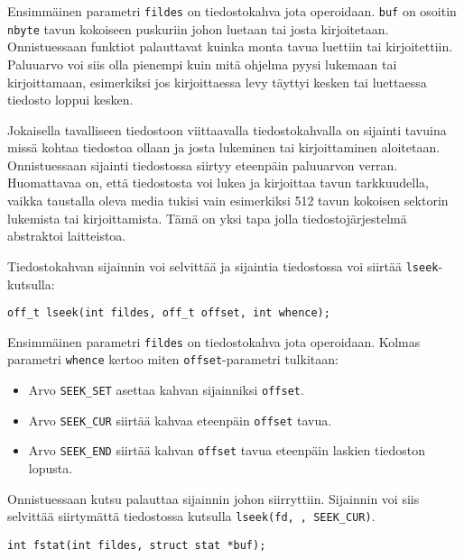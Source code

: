 Ensimmäinen parametri \texttt{fildes} on tiedostokahva jota operoidaan.
\texttt{buf} on osoitin \texttt{nbyte} tavun kokoiseen puskuriin johon
luetaan tai josta kirjoitetaan.
Onnistuessaan funktiot palauttavat kuinka monta tavua luettiin tai kirjoitettiin.
Paluuarvo voi siis olla pienempi kuin mitä ohjelma pyysi lukemaan tai kirjoittamaan,
esimerkiksi jos kirjoittaessa levy täyttyi kesken tai luettaessa
tiedosto loppui kesken.

Jokaisella tavalliseen tiedostoon viittaavalla tiedostokahvalla on
sijainti tavuina missä kohtaa tiedostoa ollaan ja josta
lukeminen tai kirjoittaminen aloitetaan.
Onnistuessaan sijainti tiedostossa siirtyy eteenpäin paluuarvon verran.
Huomattavaa on, että tiedostosta voi lukea ja kirjoittaa tavun tarkkuudella,
vaikka taustalla oleva media tukisi vain esimerkiksi 512 tavun kokoisen sektorin lukemista tai kirjoittamista.
Tämä on yksi tapa jolla tiedostojärjestelmä abstraktoi laitteistoa.

Tiedostokahvan sijainnin voi selvittää ja sijaintia tiedostossa voi
siirtää \texttt{lseek}-kutsulla:

\begin{verbatim}
off_t lseek(int fildes, off_t offset, int whence);
\end{verbatim}

Ensimmäinen parametri \texttt{fildes} on tiedostokahva jota operoidaan.
Kolmas parametri \texttt{whence} kertoo miten \texttt{offset}-parametri tulkitaan:

\begin{itemize}
    \item Arvo \texttt{SEEK\_SET} asettaa kahvan sijainniksi \texttt{offset}.
    \item Arvo \texttt{SEEK\_CUR} siirtää kahvaa eteenpäin \texttt{offset} tavua.
    \item Arvo \texttt{SEEK\_END} siirtää kahvan \texttt{offset} tavua eteenpäin laskien tiedoston lopusta.
\end{itemize}

Onnistuessaan kutsu palauttaa sijainnin johon siirryttiin.
Sijainnin voi siis selvittää siirtymättä tiedostossa kutsulla \texttt{lseek(fd, , SEEK\_CUR)}.

\begin{verbatim}
int fstat(int fildes, struct stat *buf);
\end{verbatim}

